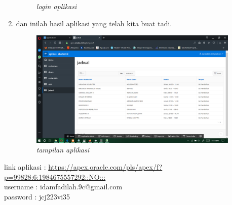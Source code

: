 \documentclass[12pt]{ociamthesis}  %
\begin{document}
\begin{enumerate}
\begin{figure}[H]
    \caption{\textit{login aplikasi}}
    \label{foto21}
 	\end{figure}
	\item dan inilah hasil aplikasi yang telah kita buat tadi. 
	\begin{figure}[H]
    \centering
	\includegraphics[width=10cm]{figures/run app/Screenshot (250).png} 
    \caption{\textit{tampilan aplikasi}}
    \label{foto21}
 	\end{figure}
\end{enumerate}
link aplikasi : \url{https://apex.oracle.com/pls/apex/f?p=99828:6:1984675557292::NO:::}\\
username 	  : idamfadilah.9c@gmail.com\\
password      : jcj223vi35\\
\end{document}
